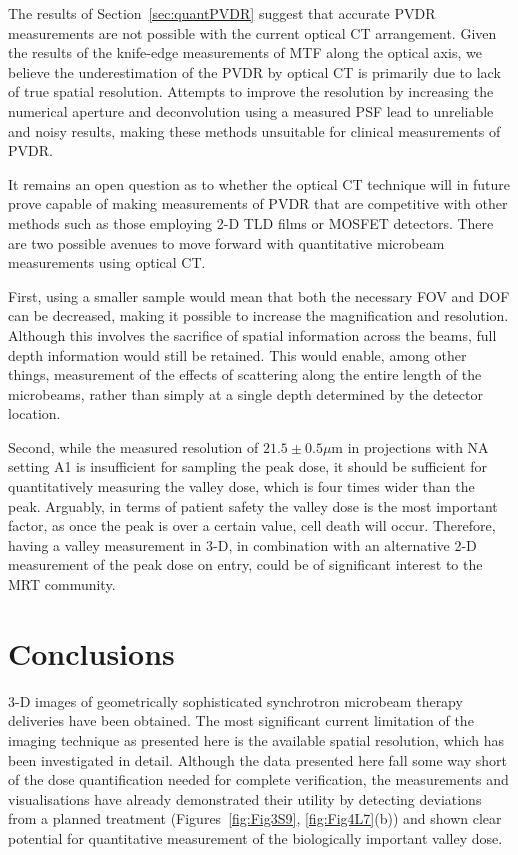 \documentclass[12pt]{article}
\begin{document}
The results of Section~\ref{sec:quantPVDR} suggest that accurate PVDR measurements are not possible with the current optical CT arrangement. Given the results of the knife-edge measurements of MTF along the optical axis, we believe the underestimation of the PVDR by optical CT is primarily due to lack of true spatial resolution. Attempts to improve the resolution by increasing the numerical aperture and deconvolution using a measured PSF lead to unreliable and noisy results, making these methods unsuitable for clinical measurements of PVDR.   

It remains an open question as to whether the optical CT technique will in future prove capable of making measurements of PVDR that are competitive with other methods such as those employing 2-D TLD films or MOSFET detectors. There are two possible avenues to move forward with quantitative microbeam measurements using optical CT. 

First, using a smaller sample would mean that both the necessary FOV and DOF can be decreased, making it possible to increase the magnification and resolution. Although this involves the sacrifice of spatial information across the beams, full depth information would still be retained. This would enable, among other things, measurement of the effects of scattering along the entire length of the microbeams, rather than simply at a single depth determined by the detector location. 

Second, while the measured resolution of $21.5 \pm 0.5 \mu$m in projections with NA setting A1 is insufficient for sampling the peak dose, it should be sufficient for quantitatively measuring the valley dose, which is four times wider than the peak. Arguably, in terms of patient safety the valley dose is the most important factor, as once the peak is over a certain value, cell death will occur. Therefore, having a valley measurement in 3-D, in combination with an alternative 2-D measurement of the peak dose on entry, could be of significant interest to the MRT community.

\section{Conclusions}
3-D images of geometrically sophisticated synchrotron microbeam therapy deliveries have been obtained. The most significant current limitation of the imaging technique as presented here is the available spatial resolution, which has been investigated in detail. Although the data presented here fall some way short of the dose quantification needed for complete verification, the measurements and visualisations have already demonstrated their utility by detecting deviations from a planned treatment (Figures~\ref{fig:Fig3S9}, \ref{fig:Fig4L7}(b)) and shown clear potential for quantitative measurement of the biologically important valley dose.






\end{document}
